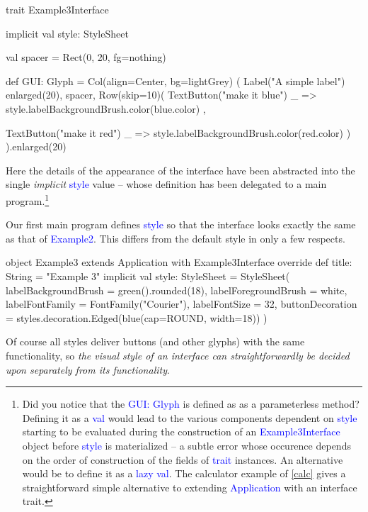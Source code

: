\documentclass[12pt,a4paper]{article}
\def\Scala#1{\textcolor{blue}{\textsf{#1}}}
\begin{document}
\begin{scala}
trait Example3Interface {
  implicit val style: StyleSheet

  val spacer = Rect(0, 20, fg=nothing)

  def GUI: Glyph = Col(align=Center, bg=lightGrey) (
    Label("A simple label") enlarged(20),
    spacer,
    Row(skip=10)(
      TextButton("make it blue")
      { _ => style.labelBackgroundBrush.color(blue.color) },

      TextButton("make it red")
      { _ => style.labelBackgroundBrush.color(red.color) }
    )
  ).enlarged(20)

}
\end{scala}

Here the details of the appearance of the interface have been
abstracted into the single \textit{implicit } \Scala{style} value
-- whose definition has been delegated to a main program.\footnote{
Did you notice that the  \Scala{GUI: Glyph} is defined as as a
parameterless method?  Defining it as a \Scala{val} would lead
to the various components dependent on \Scala{style} starting to be evaluated
during the construction of an \Scala{Example3Interface} object
before \Scala{style} is materialized -- a subtle error
whose occurence depends on the order of construction of
the fields of \Scala{trait} instances. An alternative would be
to define it as a \Scala {lazy val}. The calculator example of \ref{calc} gives
a straightforward simple alternative to extending \Scala{Application} with
an interface trait.}

\begin{center}
\end{center}

Our first main program defines \Scala{style} so that the
interface looks exactly the same as that of \Scala{Example2}.
This differs from the default style in only a few respects.
\begin{scala}
object Example3 extends Application with Example3Interface  {
    override def title: String = "Example 3"
    implicit val style: StyleSheet = StyleSheet(
      labelBackgroundBrush  = green().rounded(18),
      labelForegroundBrush  = white,
      labelFontFamily       = FontFamily("Courier"),
      labelFontSize         = 32,
      buttonDecoration = styles.decoration.Edged(blue(cap=ROUND, width=18))
    )
}
\end{scala}

Of course all styles deliver buttons (and other glyphs) with the
same functionality, so \textit{ the  visual style of an interface can
straightforwardly be decided upon separately from its functionality}.
\end{document}
